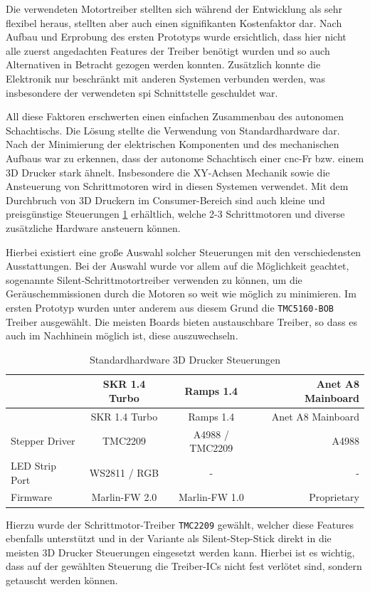 Die verwendeten Motortreiber stellten sich während der Entwicklung als
sehr flexibel heraus, stellten aber auch einen signifikanten
Kostenfaktor dar. Nach Aufbau und Erprobung des ersten Prototyps wurde
ersichtlich, dass hier nicht alle zuerst angedachten Features der
Treiber benötigt wurden und so auch Alternativen in Betracht gezogen
werden konnten. Zusätzlich konnte die Elektronik nur beschränkt mit
anderen Systemen verbunden werden, was insbesondere der verwendeten
\gls{spi} Schnittstelle geschuldet war.

All diese Faktoren erschwerten einen einfachen Zusammenbau des autonomen
Schachtischs. Die Lösung stellte die Verwendung von Standardhardware
dar. Nach der Minimierung der elektrischen Komponenten und des
mechanischen Aufbaus war zu erkennen, dass der autonome Schachtisch
einer \gls{cnc}-Fr bzw. einem 3D Drucker stark ähnelt. Insbesondere die
XY-Achsen Mechanik sowie die Ansteuerung von Schrittmotoren wird in
diesen Systemen verwendet. Mit dem Durchbruch von 3D Druckern im
Consumer-Bereich sind auch kleine und preisgünstige Steuerungen
\ref{3dmarlinctl} erhältlich, welche 2-3 Schrittmotoren und diverse
zusätzliche Hardware ansteuern können.

Hierbei existiert eine große Auswahl solcher Steuerungen mit den
verschiedensten Ausstattungen. Bei der Auswahl wurde vor allem auf die
Möglichkeit geachtet, sogenannte Silent-Schrittmotortreiber verwenden zu
können, um die Geräuschemmissionen durch die Motoren so weit wie möglich
zu minimieren. Im ersten Prototyp wurden unter anderem aus diesem Grund
die \passthrough{\lstinline!TMC5160-BOB!} Treiber ausgewählt. Die
meisten Boards bieten austauschbare Treiber, so dass es auch im
Nachhinein möglich ist, diese auszuwechseln.

\begin{longtable}[]{@{}lccr@{}}
\caption{Standardhardware 3D Drucker Steuerungen
\label{3dmarlinctl}}\tabularnewline
\toprule
& SKR 1.4 Turbo & Ramps 1.4 & Anet A8 Mainboard\tabularnewline
\midrule
\endfirsthead
\toprule
& SKR 1.4 Turbo & Ramps 1.4 & Anet A8 Mainboard\tabularnewline
\midrule
\endhead
Stepper Driver & TMC2209 & A4988 / TMC2209 & A4988\tabularnewline
LED Strip Port & WS2811 / RGB & - & -\tabularnewline
Firmware & Marlin-FW 2.0 & Marlin-FW 1.0 & Proprietary\tabularnewline
\bottomrule
\end{longtable}

Hierzu wurde der Schrittmotor-Treiber \passthrough{\lstinline!TMC2209!}
gewählt, welcher diese Features ebenfalls unterstützt und in der
Variante als Silent-Step-Stick direkt in die meisten 3D Drucker
Steuerungen eingesetzt werden kann. Hierbei ist es wichtig, dass auf der
gewählten Steuerung die Treiber-ICs nicht fest verlötet sind, sondern
getauscht werden können.

